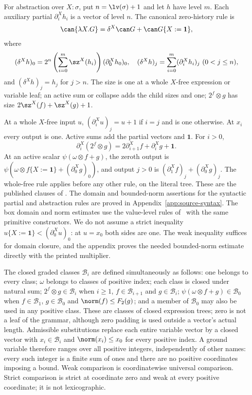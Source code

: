 For abstraction over $X:\sigma$, put $n=\lv(\sigma)+1$ and let $h$
have level $m$.  Each auxiliary partial $\partial_i^Xh_i$ is a vector
of level $n$.  The canonical zero-history rule is
\[
 \can{\lambda X.G}=\delta^X\can G+\can G\{X:=\mathbf1\},
\]
where
\[
 (\delta^Xh)_0=2^n\left(\sum_{i=0}^m\sz^X(h_i)\right)(\partial_0^Xh_0)_0,
\quad
 (\delta^Xh)_j=\sum_{i=0}^m(\partial_i^Xh_i)_j\ (0<j\le n),
\]
and $(\delta^Xh)_j=h_j$ for $j>n$.
The size is one at a whole $X$-free expression or variable leaf; an active
sum or collapse adds the child sizes and one; $2^f\otimes g$ has size
$2\sz^X(f)+\sz^X(g)+1$.

At a whole $X$-free input $u$, $(\partial_i^Xu)_j=u+1$ if $i=j$ and
is one otherwise.  At $x_i$ every output is one.  Active sums add the
partial vectors and $\mathbf1$.  For $i>0$,
\[
 \partial_i^X(2^f\otimes g)=2\partial_{i+1}^Xf+\partial_i^Xg+\mathbf1.
\]
At an active scalar $\psi(\omega\otimes f+g)$, the zeroth output is
$\psi(\omega\otimes f\{X:=\mathbf1\}+(\partial_0^Xg)_0)$, and output
$j>0$ is $(\partial_1^Xf)_j+(\partial_0^Xg)_j$.
The whole-free rule applies before any other rule, on the literal tree.
These are the published clauses of \cite[Definitions 2.10, 2.18 and 3.1]{ww}.
The domain and bounded-norm assertions for the syntactic partial and
abstraction rules are proved in Appendix~\ref{app:source-syntax}. The box
domain and norm estimates use the value-level rules of~\cite{ww} with
the same primitive constructors. We do not assume a strict inequality
$u\{X:=\mathbf1\}<(\partial_0^Xu)_0$: at $u=x_0$ both sides are one.
The weak inequality suffices for domain closure, and the appendix proves
the needed bounded-norm estimate directly with the printed multiplier.

The closed graded classes $\mathcal B_i$ are defined simultaneously as follows:
one belongs to every class; $\omega$ belongs to classes of positive index;
each class is closed under natural sum; $2^f\otimes g\in\mathcal B_i$
when $i\ge1$, $f\in\mathcal B_{i+1}$ and $g\in\mathcal B_i$;
$\psi(\omega\otimes f+g)\in\mathcal B_0$ when
$f\in\mathcal B_1$, $g\in\mathcal B_0$ and $\norm(f)\le F_2(g)$;
and a member of $\mathcal B_0$ may also be used in any positive class.
These are classes of closed expression trees; zero is not a leaf of the
grammar, although zero padding is used outside a vector's actual length.
Admissible substitutions replace each entire variable vector by a closed
vector with $x_i\in\mathcal B_i$ and $\norm(x_i)\le x_0$ for every
positive index.  A ground variable therefore ranges over all positive
integers, independently of other names: every such integer is a finite sum
of ones and there are no positive coordinates imposing a bound.
Weak comparison is coordinatewise universal comparison.  Strict comparison
is strict at coordinate zero and weak at every positive coordinate; it is
not lexicographic.

